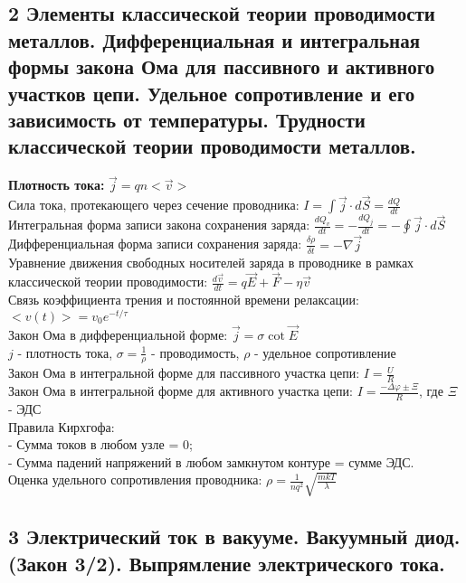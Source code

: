 \documentclass[a4paper,12pt]{article}
\begin{document}
\subsection{2	Элементы классической теории проводимости металлов. Дифференциальная и интегральная формы закона Ома для пассивного и активного участков цепи. Удельное сопротивление и его зависимость от температуры. Трудности классической теории проводимости металлов.}
\textbf{Плотность тока:} $\vec{j} = qn<\vec{v}>$\\
Сила тока, протекающего через сечение проводника: $I = \int \vec{j} \cdot d\vec{S} = \frac{dQ}{dt}$\\
Интегральная форма записи закона сохранения заряда: $\frac{dQ_v}{dt} = - \frac{dQ_j}{dt} = - \oint \vec{j} \cdot d\vec{S}$\\
Дифференциальная форма записи сохранения заряда: $\frac{\delta \rho}{\delta t} = - \nabla \vec{j}$\\
Уравнение движения свободных носителей заряда в проводнике в рамках классической теории проводимости: $\frac{d \vec{v}}{dt} = q \vec{E} + \vec{F} - \eta \vec{v}$\\
Связь коэффициента трения и постоянной времени релаксации: $<v(t)> = v_0 e^{-t/\tau}$\\
Закон Ома в дифференциальной форме: $\vec{j} = \sigma \cot  \vec{E}$\\
$j$ - плотность тока, $\sigma = \frac{1}{\rho}$ - проводимость, $\rho$ - удельное сопротивление\\
Закон Ома в интегральной форме для пассивного участка цепи: $I = \frac{U}{R}$\\
Закон Ома в интегральной форме для активного участка цепи: $I = \frac{-\Delta \varphi \pm \Xi}{R}$, где $\Xi$ - ЭДС\\ 
Правила Кирхгофа:\\
- Сумма токов в любом узле = 0;\\
- Сумма падений напряжений в любом замкнутом контуре = сумме ЭДС.\\
Оценка удельного сопротивления проводника: $\rho = \frac{1}{nq^2} \sqrt{\frac{mkT}{\lambda}}$\\


\subsection{3	Электрический ток в вакууме. Вакуумный диод. (Закон 3/2). Выпрямление электрического тока.}
\end{document}
